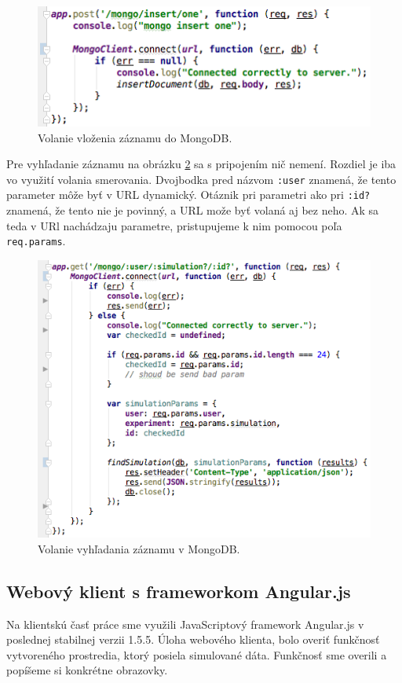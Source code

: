 \begin{figure}[H]
  \centering
  \includegraphics[scale=0.7]{img/code/express-mongo-insert2.png}
  \caption{Volanie vloženia záznamu do MongoDB.}
  \label{img-express-mongodb-insert2}
\end{figure}

Pre vyhľadanie záznamu na obrázku \ref{img-express-mongodb-find2} sa s pripojením nič nemení.
Rozdiel je iba vo využití volania smerovania. Dvojbodka pred názvom \verb|:user| znamená, že tento parameter môže byť v URL dynamický. Otáznik pri parametri ako pri \verb|:id?| znamená, že tento nie je povinný, a URL može byť volaná aj bez neho. Ak sa teda v URl nachádzaju parametre, pristupujeme k nim pomocou poľa \verb|req.params|.

\begin{figure}[H]
  \centering
  \includegraphics[scale=0.7]{img/code/express-mongodb-find2.png}
  \caption{Volanie vyhľadania záznamu v MongoDB.}
  \label{img-express-mongodb-find2}
\end{figure}
 
\subsection{Webový klient s frameworkom Angular.js}\label{section-angular-web}
Na klientskú časť práce sme využili JavaScriptový framework Angular.js v poslednej stabilnej verzii 1.5.5. Úloha webového klienta, bolo overiť funkčnosť vytvoreného prostredia, ktorý posiela simulované dáta. Funkčnosť sme overili a popíšeme si konkrétne obrazovky.

